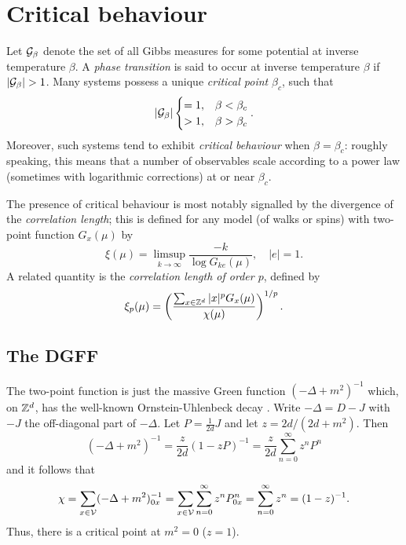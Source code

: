 

\section{Critical behaviour}

Let $\mathcal{G}_\beta$ denote the set of all Gibbs measures for some potential at inverse temperature
$\beta$. A \emph{phase transition} is said to occur at inverse temperature $\beta$ if
$|\mathcal{G}_\beta| > 1$. Many systems possess a unique \emph{critical point} $\beta_c$, such that
\begin{equation}
|\mathcal{G}_\beta|
\begin{cases}
=1,  & \beta < \beta_c \\
> 1, & \beta > \beta_c
\end{cases}.
\end{equation}
Moreover, such systems tend to exhibit \emph{critical behaviour} when $\beta = \beta_c$:
roughly speaking, this means that a number of observables scale according to a power
law (sometimes with logarithmic corrections) at or near $\beta_c$.

The presence of critical behaviour is most notably signalled by the divergence of the
\emph{correlation length}; this is defined for any model (of walks or spins) with two-point
function $G_x(\mu)$ by
\begin{equation}
\xi(\mu) = \limsup_{k\to\infty} \frac{-k}{\log G_{ke}(\mu)}, \quad |e| = 1.
\end{equation}
A related quantity is the \emph{correlation length of order $p$}, defined by
\begin{equation}
\xi_p(\mu) = \left(\frac{\sum_{x\in{ {{\mathbb Z}}^d }} |x|^p G_x(\mu)}{\chi(\mu)}\right)^{1/p}.
\end{equation}


\subsection{The DGFF}

The two-point function is just the massive Green function $(-\Delta + m^2)^{-1}$
which, on ${ {{\mathbb Z}}^d }$, has the well-known Ornstein-Uhlenbeck decay . Write $-\Delta = D - J$ with $-J$ the off-diagonal part of
$-\Delta$. Let $P = \frac{1}{2 d} J$ and let $z = 2 d / (2 d + m^2)$. Then
\begin{equation}
(-\Delta + m^2)^{-1}
  =
\frac{z}{2 d} (1 - z P)^{-1}
  =
\frac{z}{2 d} \sum_{n=0}^\infty z^n P^n
\end{equation}
and it follows that
\begin{equation}
\chi
  =
\sum_{x\in\mathcal{V}} (-\Delta + m^2)^{-1}_{0x}
  =
\sum_{x\in\mathcal{V}} \sum_{n=0}^\infty z^n P^n_{0x}
  =
\sum_{n=0}^\infty z^n
  =
(1 - z)^{-1}.
\end{equation}
Thus, there is a critical point at $m^2 = 0$ ($z = 1$).

